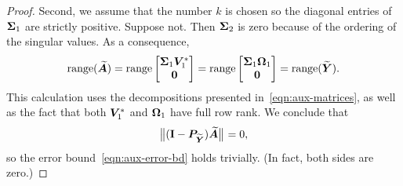 \documentclass[final]{siamltex}
\begin{document}
\begin{proof}
Second, we assume that the number $k$ is chosen so the diagonal entries of
$\bm{\Sigma}_1$ are strictly positive.  Suppose not.  Then $\bm{\Sigma}_2$
is zero because of the ordering of the singular values.  As a consequence,
$$
\operatorname{range}(\widetilde{\bm{A}})
	= \operatorname{range} \begin{bmatrix} \bm{\Sigma}_1 \bm{V}_1^* \\ \bm{0} \end{bmatrix}
	= \operatorname{range} \begin{bmatrix} \bm{\Sigma}_1 \bm{\Omega}_1 \\ \bm{0} \end{bmatrix}
	= \operatorname{range}( \widetilde{\bm{Y}} ).
$$
This calculation uses the decompositions presented in~\eqref{eqn:aux-matrices}, as well as the fact that both $\bm{V}_1^*$ and $\bm{\Omega}_1$ have full row rank.
We conclude that
$$
	{\bigl\Vert { (\mathbf{I}- \bm{P}_{\widetilde{\bm{Y}}}) \widetilde{\bm{A}} } \bigr\Vert}_{}
	= 0,
$$
so the error bound~\eqref{eqn:aux-error-bd} holds trivially.  (In fact, both sides are zero.)





\end{proof}
\end{document}
